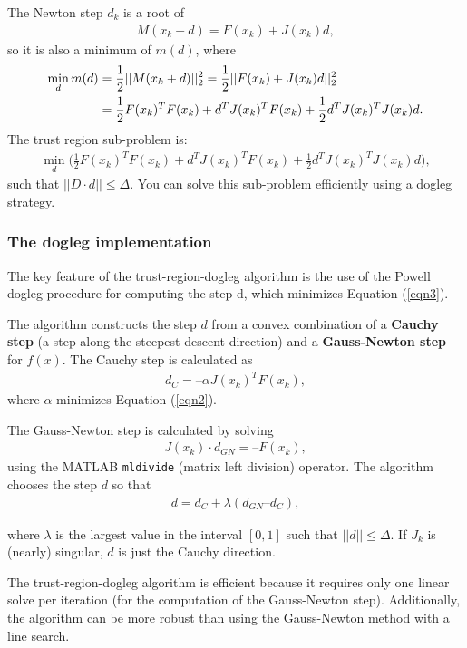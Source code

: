 \documentclass[11pt, a4paper]{article}
\theoremstyle{definition}
\begin{document}
The Newton step $d_k$ is a root of
\begin{align*}
M(x_k + d) = F(x_k) + J(x_k)d,
\end{align*}
so it is also a minimum of $m(d)$, where
\begin{align}\label{eqn2}
\min_d m(d)&= \frac{1}{2}|| M(x_k+d)||_2^2 = \frac{1}{2}||F(x_k) + J(x_k)d||_2^2\\
&=\frac{1}{2}F(x_k)^T F(x_k) + d^T J(x_k)^T F(x_k) + \frac{1}{2}d^T J(x_k)^T J(x_k) d. \notag
\end{align}
The trust region sub-problem is:
\begin{align}\label{eqn3}
\min_d \bigg( \frac{1}{2}F(x_k)^T F(x_k) + d^T J(x_k)^T F(x_k) + \frac{1}{2}d^T J(x_k)^T J(x_k) d\bigg),
\end{align}
such that $||D \cdot d|| \leq \Delta$. You can solve this sub-problem efficiently using a dogleg strategy.
\subsubsection{The dogleg implementation}
The key feature of the trust-region-dogleg algorithm is the use of the Powell dogleg procedure for computing the step d, which minimizes Equation (\ref{eqn3}). 

The algorithm constructs the step $d$ from a convex combination of a \textbf{Cauchy step} (a step along the steepest descent direction) and a \textbf{Gauss-Newton step} for $f(x)$. The Cauchy step is calculated as
\begin{align*}
d_C = –\alpha J(x_k)^TF(x_k),
\end{align*}
where $\alpha$ minimizes Equation (\ref{eqn2}).

The Gauss-Newton step is calculated by solving
\begin{align*}
J(x_k)\cdot d_{GN} = –F(x_k),
\end{align*}
using the MATLAB \texttt{mldivide} (matrix left division) operator.
The algorithm chooses the step $d$ so that
\begin{align*}
d = d_C + \lambda(d_{GN} – d_C),
\end{align*}

where $\lambda$ is the largest value in the interval $[0,1]$ such that $||d|| \leq \Delta $. If $J_k$ is (nearly) singular, $d$ is just the Cauchy direction.

The trust-region-dogleg algorithm is efficient because it requires only one linear solve per iteration (for the computation of the Gauss-Newton step). Additionally, the algorithm can be more robust than using the Gauss-Newton method with a line search.
\end{document}
